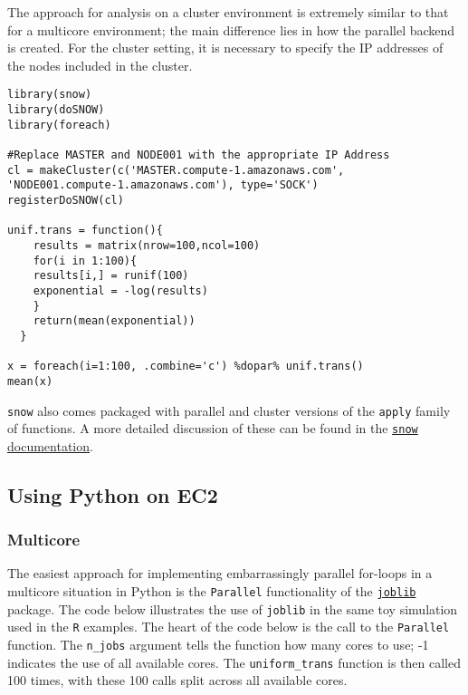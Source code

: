 \documentclass[12pt, letterpaper]{article}
\begin{document}
The approach for analysis on a cluster environment is extremely similar to that for a multicore environment; the main
difference lies in how the parallel backend is created. For the cluster setting, it is necessary to specify the IP addresses 
of the nodes included in the cluster. 

\begin{lstlisting}
library(snow)
library(doSNOW)
library(foreach)

#Replace MASTER and NODE001 with the appropriate IP Address
cl = makeCluster(c('MASTER.compute-1.amazonaws.com', 
'NODE001.compute-1.amazonaws.com'), type='SOCK')
registerDoSNOW(cl)

unif.trans = function(){
    results = matrix(nrow=100,ncol=100)
    for(i in 1:100){
    results[i,] = runif(100) 
    exponential = -log(results)
    }
    return(mean(exponential))
  }

x = foreach(i=1:100, .combine='c') %dopar% unif.trans()
mean(x)

\end{lstlisting}

\noindent
\texttt{snow} also comes packaged with parallel and cluster versions of the \texttt{apply} family of functions.
A more detailed discussion of these can be found in the
\href{http://cran.r-project.org/web/packages/snow/snow.pdf}{\texttt{snow} documentation}. 

\subsection*{Using Python on EC2}

\subsubsection*{Multicore}

The easiest approach for implementing embarrassingly parallel for-loops in a 
multicore situation in Python is the \texttt{Parallel} functionality of the 
\href{http://packages.python.org/joblib/}{\texttt{joblib}} package. The code below 
illustrates the use of \texttt{joblib} in the same toy simulation 
used in the \texttt{R} examples. The heart of the code below is the call to the 
\texttt{Parallel} function. The \texttt{n\_jobs} argument tells the function
how many cores to use; -1 indicates the use of all available cores. The
\texttt{uniform\_trans} function is then called 100 times, with these
100 calls split across all available cores. 
\end{document}
